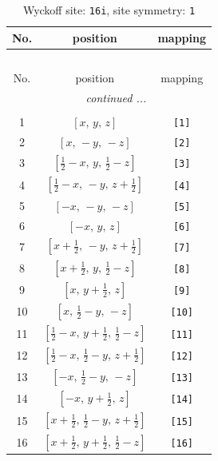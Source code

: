 \documentclass[fleqn,8pt]{jsarticle}
\begin{document}
\begin{longtable}{ccc}
\caption{Wyckoff site: {\tt 16i}, site symmetry: {\tt 1}}
 \\
 \hline \hline
No. & position & mapping \\ \hline \endfirsthead

\multicolumn{2}{l}{\tablename\ \thetable{}} \\
 \hline \hline
No. & position & mapping \\ \hline \endhead

 \hline \hline
\multicolumn{2}{r}{\footnotesize\it continued ...} \\ \endfoot

 \hline \hline
\multicolumn{2}{r}{} \\ \endlastfoot

1 & $\left[ x,\, y,\, z \right]$ & {\tt [1]} \\ \hline
2 & $\left[ x,\, - y,\, - z \right]$ & {\tt [2]} \\ \hline
3 & $\left[ \frac{1}{2} - x,\, y,\, \frac{1}{2} - z \right]$ & {\tt [3]} \\ \hline
4 & $\left[ \frac{1}{2} - x,\, - y,\, z + \frac{1}{2} \right]$ & {\tt [4]} \\ \hline
5 & $\left[ - x,\, - y,\, - z \right]$ & {\tt [5]} \\ \hline
6 & $\left[ - x,\, y,\, z \right]$ & {\tt [6]} \\ \hline
7 & $\left[ x + \frac{1}{2},\, - y,\, z + \frac{1}{2} \right]$ & {\tt [7]} \\ \hline
8 & $\left[ x + \frac{1}{2},\, y,\, \frac{1}{2} - z \right]$ & {\tt [8]} \\ \hline
9 & $\left[ x,\, y + \frac{1}{2},\, z \right]$ & {\tt [9]} \\ \hline
10 & $\left[ x,\, \frac{1}{2} - y,\, - z \right]$ & {\tt [10]} \\ \hline
11 & $\left[ \frac{1}{2} - x,\, y + \frac{1}{2},\, \frac{1}{2} - z \right]$ & {\tt [11]} \\ \hline
12 & $\left[ \frac{1}{2} - x,\, \frac{1}{2} - y,\, z + \frac{1}{2} \right]$ & {\tt [12]} \\ \hline
13 & $\left[ - x,\, \frac{1}{2} - y,\, - z \right]$ & {\tt [13]} \\ \hline
14 & $\left[ - x,\, y + \frac{1}{2},\, z \right]$ & {\tt [14]} \\ \hline
15 & $\left[ x + \frac{1}{2},\, \frac{1}{2} - y,\, z + \frac{1}{2} \right]$ & {\tt [15]} \\ \hline
16 & $\left[ x + \frac{1}{2},\, y + \frac{1}{2},\, \frac{1}{2} - z \right]$ & {\tt [16]} \\
\end{longtable}
\end{document}
